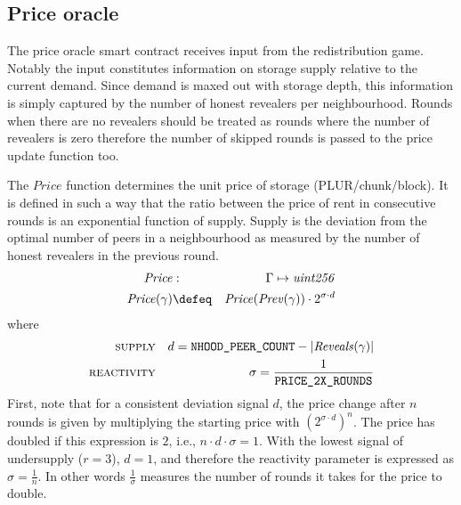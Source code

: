 \subsection{Price oracle}
\label{sec:appendix-price-oracle}

The price oracle smart contract receives input from the  redistribution game. Notably the input constitutes information on storage supply relative to the current demand. Since demand is maxed out with storage depth, this information is simply captured by the number of honest revealers per neighbourhood. Rounds when there are no revealers should be treated as rounds where the number of revealers is zero therefore the number of skipped rounds is passed to the price update function too.

\begin{definition}
\label{def:price-update-function}
The $\mathit{Price}$ function determines the unit price of storage (PLUR/chunk/block). It is defined in such a way that the ratio between the price of rent in consecutive rounds is an exponential function of supply. Supply is the deviation from the optimal number of peers in a neighbourhood as measured by the number of honest revealers in the previous round. 
\begin{eqnarray}
\mathit{Price}&:&\Gamma\mapsto\mathit{uint256}\\
\mathit{Price}(\gamma) &\defeq&\mathit{Price}(\mathit{Prev}(\gamma))\cdot 2^{\sigma\cdot d}
\end{eqnarray}
where
\begin{eqnarray}
\textsc{supply} && d = \texttt{NHOOD\_PEER\_COUNT}-\lvert\mathit{Reveals}(\gamma)\rvert\\
\textsc{reactivity} && \sigma = \frac{1}{\texttt{PRICE\_2X\_ROUNDS}}
\end{eqnarray}
First, note that for a consistent deviation signal $d$, the price change after $n$ rounds is given by multiplying the starting price with $\left(2^{\sigma\cdot d}\right)^n$. The price has doubled if this expression is $2$, i.e., $n\cdot d\cdot \sigma =1$.  
With the lowest signal of undersupply ($r=3$), $d=1$, and therefore the reactivity parameter is expressed as $\sigma=\frac{1}{n}$. In other words $\frac{1}{\sigma}$ measures the number of rounds it takes for the price to double.
\end{definition}



